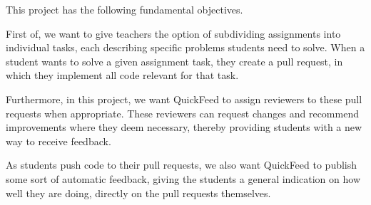 This project has the following fundamental objectives.

First of, we want to give teachers the option of subdividing assignments into individual tasks, each describing specific problems students need to solve.
When a student wants to solve a given assignment task, they create a pull request, in which they implement all code relevant for that task.

Furthermore, in this project, we want QuickFeed to assign reviewers to these pull requests when appropriate.
These reviewers can request changes and recommend improvements where they deem necessary, thereby providing students with a new way to receive feedback.

As students push code to their pull requests, we also want QuickFeed to publish some sort of automatic feedback, giving the students a general indication on how well they are doing, directly on the pull requests themselves.